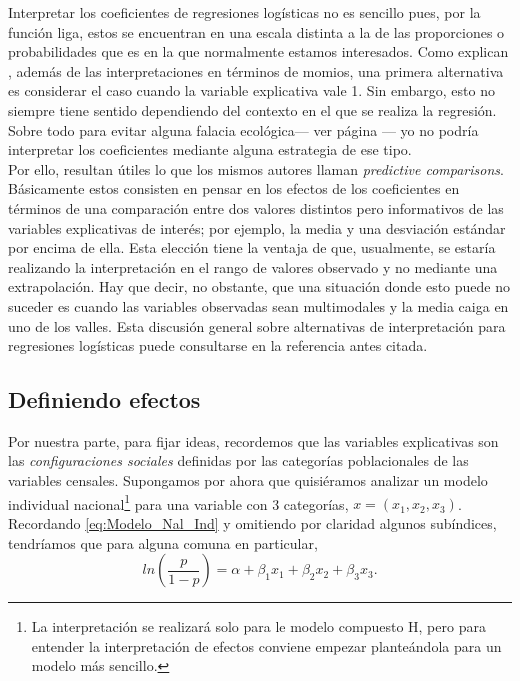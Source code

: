 Interpretar los coeficientes de regresiones logísticas no es sencillo pues, por la función liga, estos se encuentran en una escala distinta a la de las proporciones o probabilidades que es en la que normalmente estamos interesados. Como explican \textcite{GelmanHill06}, además de las interpretaciones en términos de momios, una primera alternativa es considerar el caso cuando la variable explicativa vale 1. Sin embargo, esto no siempre tiene sentido dependiendo del contexto en el que se realiza la regresión. Sobre todo para evitar alguna falacia ecológica--- ver página \pageref{No_Extrapolar}--- yo no podría interpretar los coeficientes mediante alguna estrategia de ese tipo.\\ 

 Por ello, resultan útiles lo que los mismos autores llaman \textit{predictive comparisons}. Básicamente estos consisten en pensar en los efectos de los coeficientes en términos de una comparación entre dos valores distintos pero informativos de las variables explicativas de interés; por ejemplo, la media y una desviación estándar por encima de ella. Esta elección tiene la ventaja de que, usualmente, se estaría realizando la interpretación en el rango de valores observado y no mediante una extrapolación. Hay que decir, no obstante, que una situación donde esto puede no suceder es cuando las variables observadas sean multimodales y la media caiga en uno de los valles. Esta discusión general sobre alternativas de interpretación para regresiones logísticas puede consultarse en la referencia antes citada.
 
\subsection{Definiendo efectos}

 Por nuestra parte, para fijar ideas, recordemos que las variables explicativas son las \textit{configuraciones sociales} definidas por las categorías poblacionales de las variables censales. Supongamos por ahora que quisiéramos analizar un modelo individual nacional\footnote{La interpretación se realizará solo para le modelo compuesto H, pero para entender la interpretación de efectos conviene empezar planteándola para un modelo más sencillo.} para una variable con 3 categorías, $x = (x_1,x_2,x_3)$. Recordando \eqref{eq:Modelo_Nal_Ind} y omitiendo por claridad algunos subíndices, tendríamos que para alguna comuna en particular,
\begin{equation*}
ln\left(\dfrac{p}{1-p}\right) = \alpha + \beta_1 x_1 + \beta_2 x_2 + \beta_3 x_3.
\end{equation*}

